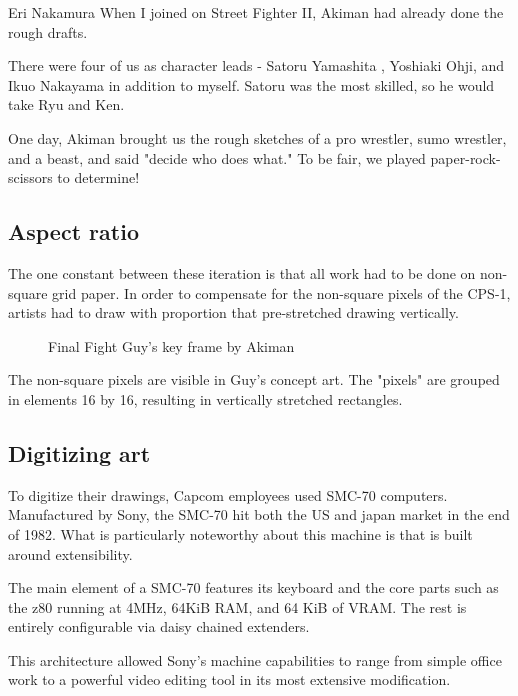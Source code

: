 \begin{q}{Eri Nakamura}
When I joined on Street Fighter II, Akiman had already done the rough drafts. 

There were four of us as character leads - Satoru Yamashita , Yoshiaki Ohji, and Ikuo Nakayama in addition to myself. Satoru was the most skilled, so he would take Ryu and Ken. 

One day, Akiman brought us the rough sketches of a pro wrestler, sumo wrestler, and a beast, and said "decide who does what." To be fair, we played paper-rock-scissors to determine!
\end{q}





\subsection{Aspect ratio}
The one constant between these iteration is that all work had to be done on non-square grid paper. In order to compensate for the non-square pixels of the CPS-1, artists had to draw with proportion that pre-stretched drawing vertically. 

\begin{figure}[H]
\caption*{Final Fight Guy's key frame by Akiman}
\label{ff_design}
\end{figure}

The non-square pixels are visible in Guy's concept art. The "pixels" are grouped in elements 16 by 16, resulting in vertically stretched rectangles.





\subsection{Digitizing art}
To digitize their drawings, Capcom employees used SMC-70 computers. Manufactured by Sony, the SMC-70 hit both the US and japan market in the end of 1982. What is particularly noteworthy about this machine is that is built around extensibility. 

The main element of a SMC-70 features its keyboard and the core parts such as the z80 running at 4MHz, 64KiB RAM, and 64 KiB of VRAM. The rest is entirely configurable via daisy chained extenders. 

This architecture allowed Sony's machine capabilities to range from simple office work to a powerful video editing tool in its most extensive modification. 

